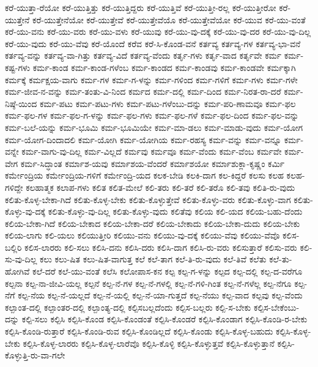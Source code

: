 {ಕರೆ-ಯುತ್ತಾ-ರೆಯೋ
ಕರೆ-ಯುತ್ತಿತ್ತು
ಕರೆ-ಯುತ್ತಿದ್ದರು
ಕರೆ-ಯುತ್ತಿವೆ
ಕರೆ-ಯುತ್ತೀ-ರಲ್ಲ
ಕರೆ-ಯುತ್ತೀರೋ
ಕರೆ-ಯುತ್ತೇನೆ
ಕರೆ-ಯುತ್ತೇನೆಯೋ
ಕರೆ-ಯುತ್ತೇವೆ
ಕರೆ-ಯುತ್ತೇವೆಯೊ
ಕರೆ-ಯುತ್ತೇವೆಯೋ
ಕರೆ-ಯುವ
ಕರೆ-ಯು-ವಂತೆ
ಕರೆ-ಯು-ವನು
ಕರೆ-ಯು-ವರು
ಕರೆ-ಯು-ವಳು
ಕರೆ-ಯುವು
ಕರೆ-ಯು-ವು-ದಕ್ಕೆ
ಕರೆ-ಯು-ವು-ದರ
ಕರೆ-ಯು-ವು-ದಿಲ್ಲ
ಕರೆ-ಯು-ವುದು
ಕರೆ-ಯು-ವೆವು
ಕರೆ-ಯೊಂದೆ
ಕರೆವ
ಕರೆ-ಸಿ-ಕೊಂಡ-ವನೆ
ಕರ್ತವ್ಯ
ಕರ್ತವ್ಯ-ಗಳ
ಕರ್ತವ್ಯ-ಭಾ-ವನೆ
ಕರ್ತವ್ಯ-ವನ್ನು
ಕರ್ತವ್ಯ-ವಾ-ಗಿತ್ತು
ಕರ್ತವ್ಯ-ವಿದೆ
ಕರ್ತವ್ಯ-ವೆಂದು
ಕರ್ತೃ-ಗಳು
ಕರ್ತೃ-ವಾದ
ಕರ್ತೃವೇ
ಕರ್ಮ
ಕರ್ಮ-ಕಷ್ಟ-ಗಳು
ಕರ್ಮ-ಕಾಂಡ
ಕರ್ಮ-ಕಾಂಡ-ಗಳೆಂಬ
ಕರ್ಮ-ಕಾಂಡದ
ಕರ್ಮ-ಕಾಂಡವು
ಕರ್ಮ-ಕಾಂಡವೇ
ಕರ್ಮಕ್ಕಾಗಿ
ಕರ್ಮಕ್ಕೆ
ಕರ್ಮಕ್ಷಯ-ವಾಗು
ಕರ್ಮ-ಗಳ
ಕರ್ಮ-ಗ-ಳನ್ನು
ಕರ್ಮ-ಗಳಿಂದ
ಕರ್ಮ-ಗಳಿಗೆ
ಕರ್ಮ-ಗಳು
ಕರ್ಮ-ಗಳೇ
ಕರ್ಮ-ಜೀವ-ನ-ವನ್ನು
ಕರ್ಮ-ತಂತು-ವಿ-ನಿಂದ
ಕರ್ಮದ
ಕರ್ಮ-ದಲ್ಲಿ
ಕರ್ಮ-ದಿಂದ
ಕರ್ಮ-ನಿರತ-ರಾ-ದರೆ
ಕರ್ಮ-ನಿಷ್ಠೆ-ಯಿಂದ
ಕರ್ಮ-ಪಟು
ಕರ್ಮ-ಪಟು-ಗಳು
ಕರ್ಮ-ಪಟು-ಗಳೆಂಬು-ದನ್ನು
ಕರ್ಮ-ಪರಿ-ಣಾಮವೂ
ಕರ್ಮ-ಫಲ
ಕರ್ಮ-ಫಲ-ಗಳ
ಕರ್ಮ-ಫಲ-ಗ-ಳನ್ನು
ಕರ್ಮ-ಫಲ-ಗಳು
ಕರ್ಮ-ಫಲ-ಗಳೆ
ಕರ್ಮ-ಫಲ-ದಿಂದ
ಕರ್ಮ-ಫಲ-ವನ್ನು
ಕರ್ಮ-ಬಲೆ-ಯನ್ನು
ಕರ್ಮ-ಭೂಮಿ
ಕರ್ಮ-ಭೂಮಿಯೇ
ಕರ್ಮ-ಮಾ-ಡಲು
ಕರ್ಮ-ಮಾಡು-ವುದು
ಕರ್ಮ-ಯೋಗ
ಕರ್ಮ-ಯೋಗ-ದಿಂದಾದಲಿ
ಕರ್ಮ-ಯೋಗಿ
ಕರ್ಮ-ಯೋಗಿಯ
ಕರ್ಮ-ರಹಸ್ಯ
ಕರ್ಮ-ವನ್ನು
ಕರ್ಮ-ವನ್ನೂ
ಕರ್ಮ-ವನ್ನೇ
ಕರ್ಮ-ವಾಗು-ವು-ದಿಲ್ಲ
ಕರ್ಮ-ವಿಲ್ಲದೆ
ಕರ್ಮವು
ಕರ್ಮವೂ
ಕರ್ಮ-ವೆಂದು
ಕರ್ಮ-ವೆಂಬ
ಕರ್ಮವೇ
ಕರ್ಮ-ವೇಗ
ಕರ್ಮ-ಸಿದ್ಧಾಂತ
ಕರ್ಮಾಶ-ಯವು
ಕರ್ಮಾಶಯ-ವೆಂದರೆ
ಕರ್ಮಾಶಯೋ
ಕರ್ಮಾಶುಕ್ಲಾ-ಕೃಷ್ಣಂ
ಕರ್ಮಿ
ಕರ್ಮೇಂದ್ರಿಯ
ಕರ್ಮೇಂದ್ರಿಯ-ಗಳಿಗೆ
ಕರ್ಮೇಂದ್ರಿ-ಯದ
ಕಲಕ-ಬೇಡಿ
ಕಲಕಿ-ದಾಗ
ಕಲ-ಕಿದ್ದರೆ
ಕಲಸು
ಕಲಹ
ಕಲಹ-ಗಳಿದ್ದೇ
ಕಲಹಾತ್ಮಕ
ಕಲಾಪ-ಗಳು
ಕಲಿತ
ಕಲಿತ-ಮೇಲೆ
ಕಲಿ-ತರು
ಕಲಿ-ತರೆ
ಕಲಿ-ತರೊ
ಕಲಿ-ತವು
ಕಲಿತಿ-ರು-ವುದು
ಕಲಿತು-ಕೊಳ್ಳ-ಬೇಕಾ-ಗಿದೆ
ಕಲಿತು-ಕೊಳ್ಳ-ಬೇಕು
ಕಲಿತು-ಕೊಳ್ಳುತ್ತೇವೆ
ಕಲಿತು-ಕೊಳ್ಳು-ವರು
ಕಲಿತು-ಕೊಳ್ಳು-ವಾಗ
ಕಲಿತು-ಕೊಳ್ಳು-ವು-ದಕ್ಕೆ
ಕಲಿತು-ಕೊಳ್ಳು-ವು-ದಿಲ್ಲ
ಕಲಿತು-ಕೊಳ್ಳು-ವುದು
ಕಲಿತೆವು
ಕಲಿಯ
ಕಲಿ-ಯದ
ಕಲಿಯ-ಬಹು-ದೆಂದು
ಕಲಿಯ-ಬೇಕಾ-ಗಿದೆ
ಕಲಿಯ-ಬೇಕಾದ
ಕಲಿಯ-ಬೇಕಾ-ದರೆ
ಕಲಿಯ-ಬೇಕಾದು
ಕಲಿಯ-ಬೇಕಾ-ದುದು
ಕಲಿಯ-ಬೇಕು
ಕಲಿಯ-ಲಾಗು
ಕಲಿ-ಯಲು
ಕಲಿಯುತ್ತೀರಿ
ಕಲಿಯು-ವನು
ಕಲಿಯು-ವು-ದಕ್ಕೆ
ಕಲಿಯು-ವೆವು
ಕಲಿಯು-ವೆವೊ
ಕಲಿಸ-ಬಲ್ಲಿರಿ
ಕಲಿಸ-ಲಾರರು
ಕಲಿ-ಸಲು
ಕಲಿಸಿ-ದನು
ಕಲಿಸಿ-ದರು
ಕಲಿಸಿ-ದಾಗ
ಕಲಿಸಿ-ರು-ವರು
ಕಲಿಸುತ್ತಾರೆ
ಕಲಿಸು-ವರು
ಕಲಿ-ಸು-ವು-ದಿಲ್ಲ
ಕಲು
ಕಲು-ಷಿತ
ಕಲು-ಷಿತ-ವಾಗುತ್ತ
ಕಲೆ
ಕಲೆ-ತಾಗ
ಕಲೆ-ತಿ-ರು-ವುದು
ಕಲೆ-ತಿವೆ
ಕಲೆತು
ಕಲೆ-ತು-ಹೋಗಿವೆ
ಕಲೆ-ದರೆ
ಕಲೆ-ಯು-ವಂತೆ
ಕಲೆಸಿ
ಕಲೋಪಾಸ-ಕನ
ಕಲ್ಪ
ಕಲ್ಪ-ಗ-ಳನ್ನು
ಕಲ್ಪದ
ಕಲ್ಪ-ದಲ್ಲಿ
ಕಲ್ಪ-ದ-ವರೆಗೂ
ಕಲ್ಪನಾ
ಕಲ್ಪ-ನಾ-ಜೀವಿ-ಯಲ್ಲ
ಕಲ್ಪನೆ
ಕಲ್ಪ-ನೆ-ಗಳ
ಕಲ್ಪ-ನೆ-ಗಳಲ್ಲಿ
ಕಲ್ಪ-ನೆ-ಗಳಿ-ಗಿಂತ
ಕಲ್ಪ-ನೆ-ಗಳೆಲ್ಲ
ಕಲ್ಪ-ನೆಗೂ
ಕಲ್ಪ-ನೆಗೆ
ಕಲ್ಪ-ನೆಯ
ಕಲ್ಪ-ನೆ-ಯಲ್ಲದೆ
ಕಲ್ಪ-ನೆ-ಯಲ್ಲಿ
ಕಲ್ಪ-ನೆ-ಯಾ-ಗುತ್ತದೆ
ಕಲ್ಪ-ನೆಯು
ಕಲ್ಪ-ವಾದ
ಕಲ್ಪವು
ಕಲ್ಪ-ವೆಂದು
ಕಲ್ಪಾಂತ-ದಲ್ಲಿ
ಕಲ್ಪಾಂತರ-ದಲ್ಲಿ
ಕಲ್ಪಾಂತ್ಯ-ದಲ್ಲಿ
ಕಲ್ಪಿಸಬಲ್ಲದೆಂದು
ಕಲ್ಪಿಸ-ಬಲ್ಲರು
ಕಲ್ಪಿ-ಸ-ಬೇಕು
ಕಲ್ಪಿಸ-ಬೇಕೆಂಬು-ದನ್ನು
ಕಲ್ಪಿ-ಸಲು
ಕಲ್ಪಿಸಿ
ಕಲ್ಪಿಸಿ-ಕೊಂಡ
ಕಲ್ಪಿಸಿ-ಕೊಂಡಂತೆ
ಕಲ್ಪಿಸಿ-ಕೊಂಡರೆ
ಕಲ್ಪಿಸಿ-ಕೊಂಡಾಗ
ಕಲ್ಪಿಸಿ-ಕೊಂಡಿ-ರ-ಬೇಕು
ಕಲ್ಪಿಸಿ-ಕೊಂಡಿ-ರುತ್ತಾರೆ
ಕಲ್ಪಿಸಿ-ಕೊಂಡಿ-ರುವ
ಕಲ್ಪಿಸಿ-ಕೊಂಡಿಲ್ಲದೆ
ಕಲ್ಪಿಸಿ-ಕೊಂಡು
ಕಲ್ಪಿಸಿ-ಕೊಳ್ಳ-ಬಹುದು
ಕಲ್ಪಿಸಿ-ಕೊಳ್ಳ-ಬೇಕು
ಕಲ್ಪಿಸಿ-ಕೊಳ್ಳ-ಲಾರರು
ಕಲ್ಪಿಸಿ-ಕೊಳ್ಳ-ಲಾರೆವೊ
ಕಲ್ಪಿಸಿ-ಕೊಳ್ಳಿ
ಕಲ್ಪಿಸಿ-ಕೊಳ್ಳುತ್ತವೆ
ಕಲ್ಪಿಸಿ-ಕೊಳ್ಳುತ್ತಾನೆ
ಕಲ್ಪಿಸಿ-ಕೊಳ್ಳುತ್ತಿ-ರು-ವಾ-ಗಲೇ
}
